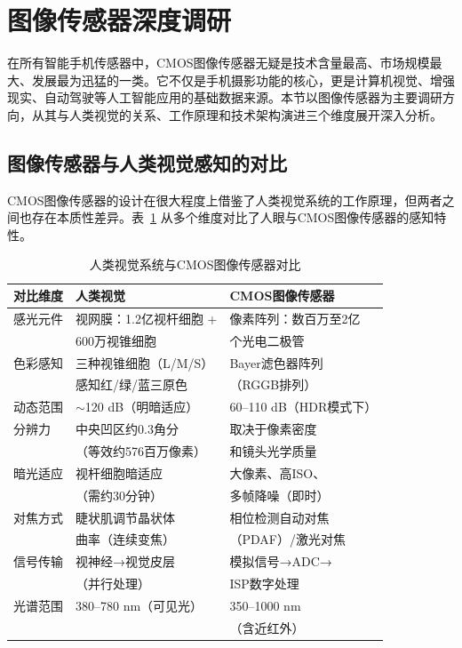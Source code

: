 \documentclass[12pt, a4paper]{ctexart}
\begin{document}
\section{图像传感器深度调研}

在所有智能手机传感器中，CMOS图像传感器无疑是技术含量最高、市场规模最大、发展最为迅猛的一类。它不仅是手机摄影功能的核心，更是计算机视觉、增强现实、自动驾驶等人工智能应用的基础数据来源。本节以图像传感器为主要调研方向，从其与人类视觉的关系、工作原理和技术架构演进三个维度展开深入分析。

\subsection{图像传感器与人类视觉感知的对比}

CMOS图像传感器的设计在很大程度上借鉴了人类视觉系统的工作原理，但两者之间也存在本质性差异。表~\ref{tab:human_vs_cmos} 从多个维度对比了人眼与CMOS图像传感器的感知特性。

\begin{table}[H]
\centering
\caption{人类视觉系统与CMOS图像传感器对比}
\label{tab:human_vs_cmos}
\small
\begin{tabular}{lll}
\toprule
\textbf{对比维度} & \textbf{人类视觉} & \textbf{CMOS图像传感器} \\
\midrule
感光元件 & 视网膜：1.2亿视杆细胞 + & 像素阵列：数百万至2亿 \\
 & 600万视锥细胞 & 个光电二极管 \\
\midrule
色彩感知 & 三种视锥细胞（L/M/S） & Bayer滤色器阵列 \\
 & 感知红/绿/蓝三原色 & （RGGB排列） \\
\midrule
动态范围 & $\sim$120 dB（明暗适应） & 60--110 dB（HDR模式下） \\
\midrule
分辨力 & 中央凹区约0.3角分 & 取决于像素密度 \\
 & （等效约576百万像素） & 和镜头光学质量 \\
\midrule
暗光适应 & 视杆细胞暗适应 & 大像素、高ISO、 \\
 & （需约30分钟） & 多帧降噪（即时） \\
\midrule
对焦方式 & 睫状肌调节晶状体 & 相位检测自动对焦 \\
 & 曲率（连续变焦） & （PDAF）/激光对焦 \\
\midrule
信号传输 & 视神经→视觉皮层 & 模拟信号→ADC→ \\
 & （并行处理） & ISP数字处理 \\
\midrule
光谱范围 & 380--780 nm（可见光） & 350--1000 nm \\
 & & （含近红外） \\
\bottomrule
\end{tabular}
\end{table}
\end{document}
